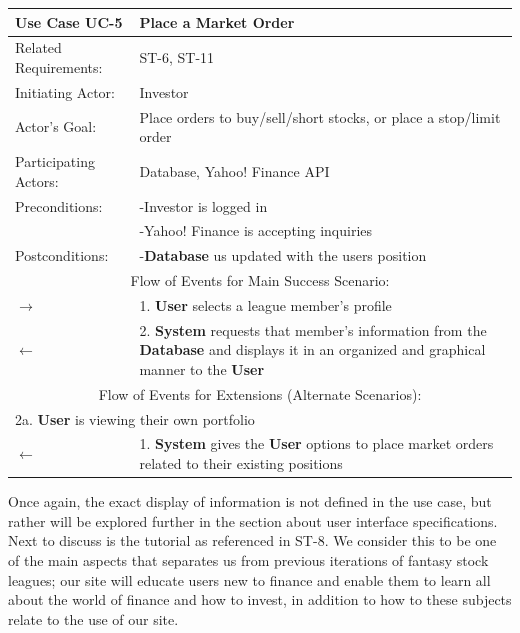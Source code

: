 \begin{centering}
\label{UC-5}
\renewcommand\arraystretch{1.3}
\begin{longtable}{|p{1.2in} p{5in}|}
\hline
\bfseries{\color{color1}Use Case UC-5} &
\bfseries{\color{color1}Place a Market Order} \\
\hline
Related Requirements: & ST-6, ST-11 \\
Initiating Actor:     & Investor \\
Actor's Goal:         & Place orders to buy/sell/short stocks, or place a stop/limit order \\
Participating Actors: & Database, Yahoo! Finance API \\
Preconditions:        & -Investor is logged in \\
                      & -Yahoo! Finance is accepting inquiries \\
Postconditions:       & -\textbf{Database} us updated with the users position \\
\hline
\multicolumn{2}{|c|}{\color{color1}Flow of Events for Main Success Scenario:}\\
\hline
$\rightarrow$ & 1. \textbf{User} selects a league member's profile \\
$\leftarrow$ & 2. \textbf{System} requests that member's information from the \textbf{Database} and displays it in an organized and graphical manner to the \textbf{User} \\
\hline
\multicolumn{2}{|c|}{\color{color1}Flow of Events for Extensions (Alternate Scenarios):} \\
\hline
\multicolumn{2}{|p{6.2in}|}{2a. \textbf{User} is viewing their own portfolio} \\
\hline
$\leftarrow$ & 1. \textbf{System} gives the \textbf{User} options to place market orders related to their existing positions \\
\hline
\end{longtable}
\end{centering}

Once again, the exact display of information is not defined in the use case, but rather
will be explored further in the section about user interface specifications. Next to
discuss is the tutorial as referenced in ST-8. We consider this to be one of the main
aspects that separates us from previous iterations of fantasy stock leagues; our site will
educate users new to finance and enable them to learn all about the world of finance and
how to invest, in addition to how to these subjects relate to the use of our site.\\

